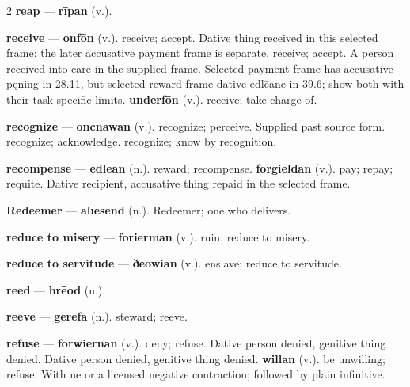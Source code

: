 \begin{multicols}{2}
\textbf{reap} — \textbf{rīpan} (v.).\par
\textbf{receive} — \textbf{onfōn} (v.). receive; accept. Dative thing received in this selected frame; the later accusative payment frame is separate. receive; accept. A person received into care in the supplied frame. Selected payment frame has accusative pęning in 28.11, but selected reward frame dative edlēane in 39.6; show both with their task-specific limits. \textbf{underfōn} (v.). receive; take charge of.\par
\textbf{recognize} — \textbf{oncnāwan} (v.). recognize; perceive. Supplied past source form. recognize; acknowledge. recognize; know by recognition.\par
\textbf{recompense} — \textbf{edlēan} (n.). reward; recompense. \textbf{forgieldan} (v.). pay; repay; requite. Dative recipient, accusative thing repaid in the selected frame.\par
\textbf{Redeemer} — \textbf{ālīesend} (n.). Redeemer; one who delivers.\par
\textbf{reduce to misery} — \textbf{forierman} (v.). ruin; reduce to misery.\par
\textbf{reduce to servitude} — \textbf{ðēowian} (v.). enslave; reduce to servitude.\par
\textbf{reed} — \textbf{hrēod} (n.).\par
\textbf{reeve} — \textbf{gerēfa} (n.). steward; reeve.\par
\textbf{refuse} — \textbf{forwiernan} (v.). deny; refuse. Dative person denied, genitive thing denied. Dative person denied, genitive thing denied. \textbf{willan} (v.). be unwilling; refuse. With ne or a licensed negative contraction; followed by plain infinitive.\par

\end{multicols}

